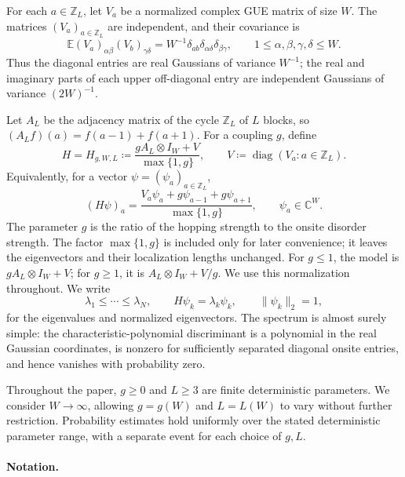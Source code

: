 \documentclass[11pt]{article}
\numberwithin{equation}{section}
\theoremstyle{remark}
\newcommand{\E}{\mathbb E}
\newcommand{\Z}{\mathbb Z}
\newcommand{\C}{\mathbb C}
\newcommand{\diag}{\operatorname{diag}}
\begin{document}
For each \(a\in\Z_L\), let \(V_a\) be a normalized complex GUE
matrix of size \(W\). The matrices \((V_a)_{a\in\Z_L}\) are
independent, and their covariance is
\begin{equation}\label{eq:covariance}
 \E(V_a)_{\alpha\beta}(V_b)_{\gamma\delta}
 =W^{-1}\delta_{ab}\delta_{\alpha\delta}\delta_{\beta\gamma},
 \qquad 1\le\alpha,\beta,\gamma,\delta\le W.
\end{equation}
Thus the diagonal entries are real Gaussians of variance \(W^{-1}\);
the real and imaginary parts of each upper off-diagonal entry are
independent Gaussians of variance \((2W)^{-1}\).

Let \(A_L\) be the adjacency matrix of the cycle \(\Z_L\) of \(L\) blocks, so
\((A_Lf)(a)=f(a-1)+f(a+1)\). For a coupling \(g\), define
\begin{equation}\label{eq:model}
 H=H_{g,W,L}\coloneqq \frac{gA_L\otimes I_W+V}{\max\{1,g\}},
 \qquad V\coloneqq \diag(V_a:a\in\Z_L).
\end{equation}
Equivalently, for a vector \(\psi=(\psi_a)_{a\in\Z_L}\),
\begin{equation}\label{eq:blockaction}
 (H\psi)_a=\frac{V_a\psi_a+g\psi_{a-1}+g\psi_{a+1}}{\max\{1,g\}},
 \qquad \psi_a\in\C^W.
\end{equation}
The parameter \(g\) is the ratio of the hopping strength to the onsite
disorder strength. The factor \(\max\{1,g\}\) is included only for later
convenience; it leaves the eigenvectors and their localization lengths
unchanged. For
\(g\le1\), the model is \(gA_L\otimes I_W+V\); for \(g\ge1\), it is
\(A_L\otimes I_W+V/g\). We use this normalization throughout.
We write
\begin{equation}\label{eq:eigenvectors}
 \lambda_1\le\cdots\le\lambda_N,\qquad
 H\psi_k=\lambda_k\psi_k,\qquad \|\psi_k\|_2=1,
\end{equation}
for the eigenvalues and normalized eigenvectors. The spectrum is
almost surely simple: the characteristic-polynomial discriminant is a
polynomial in the real Gaussian coordinates, is nonzero for sufficiently
separated diagonal onsite entries, and hence vanishes with probability zero.

Throughout the paper, $g\ge0$ and $L\ge3$ are finite deterministic
parameters. We consider $W\to\infty$, allowing $g=g(W)$ and $L=L(W)$
to vary without further restriction. Probability estimates hold uniformly
over the stated deterministic parameter range, with a separate event for
each choice of $g,L$.

\paragraph{Notation.}
\end{document}
